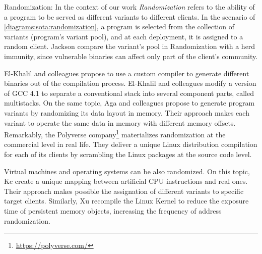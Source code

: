 
\begin{usage}{Randomization:}
    \label{usage:randomization}
    \normalfont
    In the context of our work \emph{Randomization} refers to the ability of a program to be served as different variants to different clients.
    In the scenario of \autoref{diagrams:sota:randomization}, a program is selected from the collection of variants (program's variant pool), and at each deployment, it is assigned to a random client. 
    Jackson \etal \cite{jackson} compare the variant's pool in Randomization with a herd immunity, since vulnerable binaries can affect only part of the client's community.

\end{usage}


El-Khalil and colleagues \cite{ElKhalil2004} propose to use a custom compiler to generate different binaries out of the compilation process. El-Khalil and colleagues modify a version of GCC 4.1 to separate a conventional stack into several component parts, called multistacks.
On the same topic, Aga and colleagues \cite{aga2019smokestack} propose to generate program variants by randomizing its data layout in memory. Their approach makes each variant to operate the same data in memory with different memory offsets.
Remarkably, the Polyverse company\footnote{\url{https://polyverse.com/}} materializes randomization at the commercial level in real life. They deliver a unique Linux distribution compilation for each of its clients by scrambling the Linux packages at the source code level.
    
Virtual machines and operating systems can be also randomized. On this topic, Kc \etal \cite{Kc03} create a unique mapping between artificial CPU instructions and real ones. Their approach makes possible the assignation of different variants to specific target clients. Similarly, Xu \etal \cite{xu2020merr} recompile the Linux Kernel to reduce the exposure time of persistent memory objects, increasing the frequency of address randomization.

%


